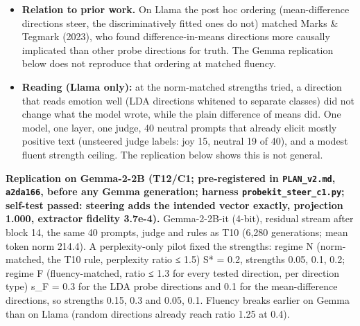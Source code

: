 \documentclass[
  10pt,
]{article}
\begin{document}
\begin{itemize}
  0.10 along random ones, and at 0.4 the perplexity ratio is 1.10--1.14
  for probe directions (random 1.08--1.15 in the pilot) but 1.37--1.68
  for mean-difference directions. Adding the probe direction at matched
  norm is therefore about as disruptive as a random direction, whereas
  the mean-difference direction perturbs the model far more per unit
  norm. A probe strength between 0.4 and 0.8 was not tried (the pilot
  grid had no point there, and fluency fails at 0.8 even for random
  directions), so a stronger, fluency-matched probe intervention remains
  untested.
\item
  \textbf{Relation to prior work.} On Llama the post hoc ordering
  (mean-difference directions steer, the discriminatively fitted ones do
  not) matched Marks \& Tegmark (2023), who found difference-in-means
  directions more causally implicated than other probe directions for
  truth. The Gemma replication below does not reproduce that ordering at
  matched fluency.
\item
  \textbf{Reading (Llama only):} at the norm-matched strengths tried, a
  direction that reads emotion well (LDA directions whitened to separate
  classes) did not change what the model wrote, while the plain
  difference of means did. One model, one layer, one judge, 40 neutral
  prompts that already elicit mostly positive text (unsteered judge
  labels: joy 15, neutral 19 of 40), and a modest fluent strength
  ceiling. The replication below shows this is not general.
\end{itemize}

\textbf{Replication on Gemma-2-2B (T12/C1; pre-registered in
\texttt{PLAN\_v2.md}, \texttt{a2da166}, before any Gemma generation;
harness \texttt{probekit\_steer\_c1.py}; self-test passed: steering adds
the intended vector exactly, projection 1.000, extractor fidelity
3.7e-4).} Gemma-2-2B-it (4-bit), residual stream after block 14, the
same 40 prompts, judge and rules as T10 (6,280 generations; mean token
norm 214.4). A perplexity-only pilot fixed the strengths: regime N
(norm-matched, the T10 rule, perplexity ratio ≤ 1.5) S* = 0.2, strengths
0.05, 0.1, 0.2; regime F (fluency-matched, ratio ≤ 1.3 for every tested
direction, per direction type) s\_F = 0.3 for the LDA probe directions
and 0.1 for the mean-difference directions, so strengths 0.15, 0.3 and
0.05, 0.1. Fluency breaks earlier on Gemma than on Llama (random
directions already reach ratio 1.25 at 0.4).
\end{document}
